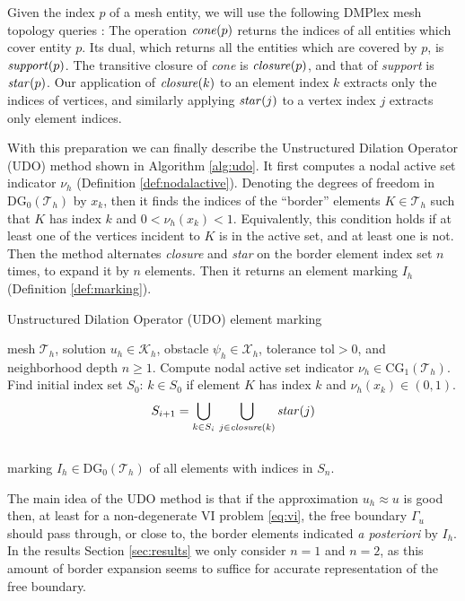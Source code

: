 \documentclass[]{interact}
\theoremstyle{plain}%
\theoremstyle{definition}
\theoremstyle{remark}
\newcommand{\cK}{\mathcal{K}}
\newcommand{\cT}{\mathcal{T}}
\newcommand{\cX}{\mathcal{X}}
\newcommand{\CG}{\text{CG}}
\newcommand{\DG}{\text{DG}}
\begin{document}
Given the index $p$ of a mesh entity, we will use the following DMPlex mesh topology queries \cite{petsc-user-ref}:  The operation $\text{\emph{cone}}(p)$ returns the indices of all entities which cover entity $p$.  Its dual, which returns all the entities which are covered by $p$, is $\text{\emph{support}}(p)$.  The transitive closure of \emph{cone} is $\text{\emph{closure}}(p)$, and that of \emph{support} is $\text{\emph{star}}(p)$.  Our application of $\text{\emph{closure}}(k)$ to an element index $k$ extracts only the indices of vertices, and similarly applying $\text{\emph{star}}(j)$ to a vertex index $j$ extracts only element indices.

With this preparation we can finally describe the Unstructured Dilation Operator (UDO) method shown in Algorithm \ref{alg:udo}.  It first computes a nodal active set indicator $\nu_h$ (Definition \ref{def:nodalactive}).  Denoting the degrees of freedom in $\DG_0(\cT_h)$ by $x_k$, then it finds the indices of the ``border'' elements $K\in\cT_h$ such that $K$ has index $k$ and $0<\nu_h(x_k)<1$.  Equivalently, this condition holds if at least one of the vertices incident to $K$ is in the active set, and at least one is not.  Then the method alternates \emph{closure} and \emph{star} on the border element index set $n$ times, to expand it by $n$ elements.  Then it returns an element marking $I_h$ (Definition \ref{def:marking}).

\begin{algorithm}[ht]
	\caption{Unstructured Dilation Operator (UDO) element marking}
	\begin{algorithmic}[1]
		\Require mesh $\cT_h$, solution $u_h \in \cK_h$, obstacle $\psi_h \in \cX_h$, tolerance $\text{tol} > 0$, and neighborhood depth $n\ge 1$.
		\State Compute nodal active set indicator $\nu_h \in \CG_1(\cT_h)$.
		\State Find initial index set $S_0$: $k\in S_0$ if element $K$ has index $k$ and $\nu_h(x_k) \in (0,1)$.
		    $$S_{i+1} = \bigcup_{k\in S_i}\, \bigcup_{j\in \text{\emph{closure}}(k)} \text{\emph{star}}(j)$$
		\EndFor \\
		\Return marking $I_h \in \DG_0(\cT_h)$ of all elements with indices in $S_n$.
	\end{algorithmic}
\label{alg:udo}
\end{algorithm}

The main idea of the UDO method is that if the approximation $u_h\approx u$ is good then, at least for a non-degenerate VI problem \eqref{eq:vi}, the free boundary $\Gamma_u$ should pass through, or close to, the border elements indicated \emph{a posteriori} by $I_h$.  In the results Section \ref{sec:results} we only consider $n=1$ and $n=2$, as this amount of border expansion seems to suffice for accurate representation of the free boundary.
\end{document}
